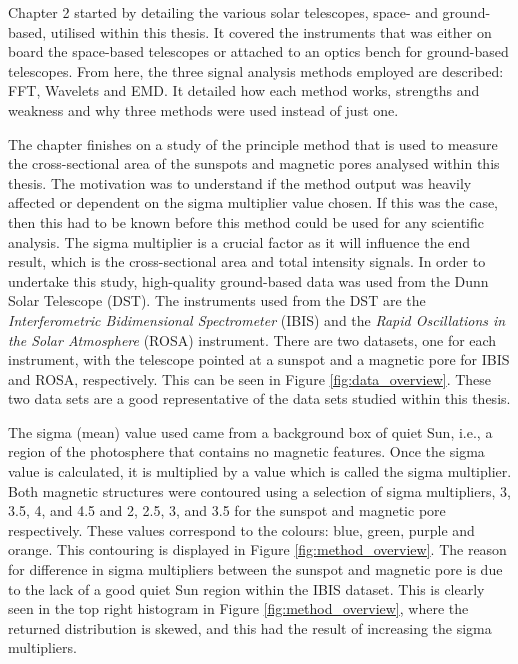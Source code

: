     Chapter 2 started by detailing the various solar telescopes, space- and ground-based, utilised within this thesis.
    It covered the instruments that was either on board the space-based telescopes or attached to an optics bench for ground-based telescopes.
    From here, the three signal analysis methods employed are described: FFT, Wavelets and EMD.
    It detailed how each method works, strengths and weakness and why three methods were used instead of just one.
    
    The chapter finishes on a study of the principle method that is used to measure the cross-sectional area of the sunspots and magnetic pores analysed within this thesis.
    The motivation was to understand if the method output was heavily affected or dependent on the sigma multiplier value chosen.
    If this was the case, then this had to be known before this method could be used for any scientific analysis.    
    The sigma multiplier is a crucial factor as it will influence the end result, which is the cross-sectional area and total intensity signals.
    In order to undertake this study, high-quality ground-based data was used from the Dunn Solar Telescope (DST).
    The instruments used from the DST are the \textit{Interferometric Bidimensional Spectrometer} (IBIS) and the \textit{Rapid Oscillations in the Solar Atmosphere} (ROSA) instrument.
    There are two datasets, one for each instrument, with the telescope pointed at a sunspot and a magnetic pore for IBIS and ROSA, respectively.
    This can be seen in Figure \ref{fig:data_overview}.
    These two data sets are a good representative of the data sets studied within this thesis.
    
    The sigma (mean) value used came from a background box of quiet Sun, i.e., a region of the photosphere that contains no magnetic features.
    Once the sigma value is calculated, it is multiplied by a value which is called the sigma multiplier.  
    Both magnetic structures were contoured using a selection of sigma multipliers, 3, 3.5, 4, and 4.5 and 2, 2.5, 3, and 3.5 for the sunspot and magnetic pore respectively.
    These values correspond to the colours: blue, green, purple and orange.
    This contouring is displayed in Figure \ref{fig:method_overview}.
    The reason for difference in sigma multipliers between the sunspot and magnetic pore is due to the lack of a good quiet Sun region within the IBIS dataset.
    This is clearly seen in the top right histogram in Figure \ref{fig:method_overview}, where the returned distribution is skewed, and this had the result of increasing the sigma multipliers.
    
